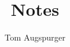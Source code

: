 \documentclass[12pt,a4paper,hidelinks]{article}            %
\begin{document}

\begin{titlepage}

\title{Notes}
\author{Tom Augspurger}                               %

\vspace*{\fill}                                            %


\center                                                    %






\vspace*{\fill}                                            %

\end{titlepage}
\end{document}

